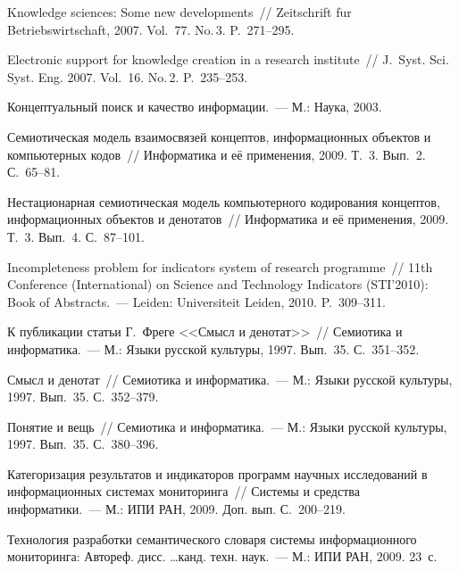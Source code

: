 \begin{multicols}{2}
{{\begin{thebibliography}{99}
Knowledge sciences: Some new developments~// Zeitschrift f$\ddot{\mbox{u}}$r Betriebswirtschaft, 2007. 
Vol.~77. No.\,3. P.~271--295.

Electronic support for knowledge creation in a research institute~// J.~Syst. Sci. Syst. Eng. 2007. 
Vol.~16. No.\,2. P.~235--253.

Концептуальный поиск и качество информации.~--- М.: Наука, 2003.
\pagebreak

Семиотическая модель взаимосвязей концептов, информационных объектов и компьютерных 
кодов~// Информатика и её применения, 2009. Т.~3. Вып.~2. С.~65--81.

Нестационарная семиотическая модель компьютерного кодирования концептов, информационных 
объектов и денотатов~// Информатика и её применения, 2009. Т.~3. Вып.~4. С.~87--101.

Incompleteness problem for indicators system of research programme~// 11th Conference (International) on 
Science and Technology Indicators (STI'2010): Book of Abstracts.~--- Leiden: Universiteit Leiden, 2010. 
P.~309--311.

К публикации статьи Г.~Фреге <<Смысл и денотат>>~// Семиотика и информатика.~--- М.: 
Языки русской культуры, 1997. Вып.~35. С.~351--352.

Смысл и денотат~// Семиотика и информатика.~--- М.: Языки русской культуры, 1997. Вып.~35. 
С.~352--379.

Понятие и вещь~// Семиотика и информатика.~--- М.: Языки русской культуры, 1997. 
Вып.~35. С.~380--396.

Категоризация результатов и индикаторов программ научных исследований в информационных 
системах мониторинга~// Системы и средства информатики.~--- М.: ИПИ РАН, 2009. Доп. вып. 
С.~200--219.

\label{end\stat}

Технология разработки семантического словаря системы информационного мониторинга: 
Автореф. дисс. \ldots канд. техн. наук.~--- М.: ИПИ РАН, 2009. 23~с.
 \end{thebibliography}
}
}


\end{multicols}       